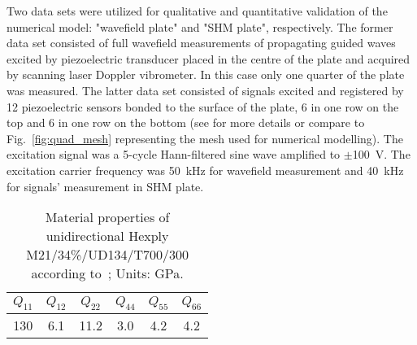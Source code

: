 \documentclass[preprint,12pt]{elsarticle}
\begin{document}
	Two data sets were utilized for qualitative and quantitative validation of the numerical model: "wavefield plate" and "SHM plate", respectively. The former data set consisted of full wavefield measurements of propagating guided waves excited by piezoelectric transducer placed in the centre of the plate and acquired by scanning laser Doppler vibrometer. In this case only one quarter of the plate was measured. The latter data set consisted of signals excited and registered by 12 piezoelectric sensors bonded to the surface of the plate, 6 in one row on the top and 6 in one row on the bottom (see \cite{Moll2018} for more details or compare to Fig.~\ref{fig:quad_mesh} representing the mesh used for numerical modelling). The excitation signal was a 5-cycle Hann-filtered sine wave amplified to $\pm$100~V. The excitation carrier frequency was 50~kHz for wavefield measurement and 40~kHz for signals' measurement in SHM plate.
	\begin{table}
		\renewcommand{\arraystretch}{1.3}
		\centering \footnotesize
		\caption{Material properties of unidirectional Hexply M21/34\%/UD134/T700/300 according to~\cite{Moll2018}; Units: GPa.}
		\begin{tabular}{cccccc} 
			\toprule
			$Q_{11}$ & $Q_{12}$  & $Q_{22}$ & $Q_{44}$ & $Q_{55}$ & $Q_{66}$\\
			\midrule
			130& 6.1& 11.2 & 3.0 & 4.2 & 4.2\\
			\bottomrule 
		\end{tabular} 
		\label{tab:mat_prop}
	\end{table}
\begin{comment}
	\begin{table}
		\renewcommand{\arraystretch}{1.3}
		\centering \footnotesize
		\caption{Material properties of unidirectional Hexply M21/34\%/UD134/T700/300 (values of stiffness tensor according to~\cite{Moll2018}; density is assumed).}
		\begin{tabular}{ccccccc} 
			\toprule
			$\rho$ & $Q_{11}$ & $Q_{12}$  & $Q_{22}$ & $Q_{44}$ & $Q_{55}$ & $Q_{66}$\\
			kg/m\textsuperscript{3} &GPa& GPa  & GPa  & GPa& GPa & GPa\\ 
			\midrule
			1571 &130& 6.1& 11.2 & 3.0 & 4.2 & 4.2\\
			\bottomrule 
		\end{tabular} 
		\label{tab:mat_prop}
	\end{table}
	\end{comment}
\end{document}
